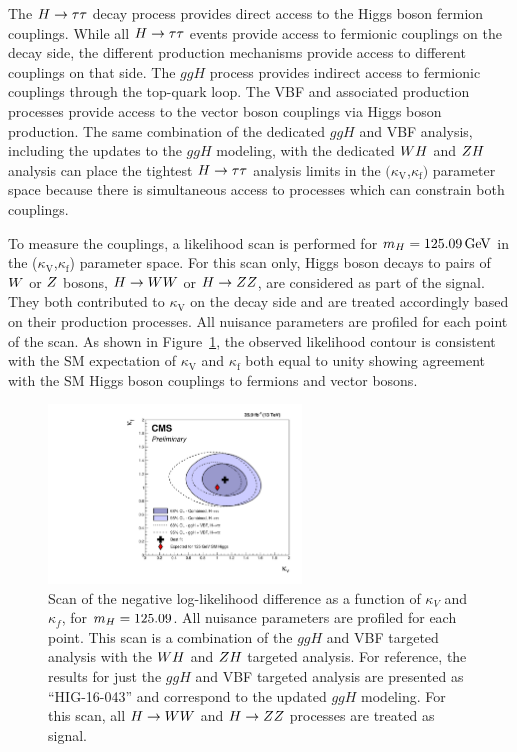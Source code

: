 The $H\to\tau\tau$ decay process
provides direct access to the Higgs boson fermion couplings. While all
$H\to\tau\tau$ events provide access to fermionic couplings on the decay side,
the different production mechanisms provide access to different couplings on that side.
The $ggH$ process provides indirect access to fermionic couplings through
the top-quark loop. The VBF and associated production processes provide access to the
vector boson couplings via Higgs boson production.
The same combination of the dedicated $ggH$ and VBF analysis, including
the updates to the $ggH$ modeling, with
the dedicated $WH$ and $ZH$ analysis can place the tightest
$H\to\tau\tau$ analysis limits in the $(\kappa_\text{V}$,$\kappa_\text{f})$ parameter space
because there is simultaneous access to processes which can constrain both
couplings.

To measure the couplings, a likelihood scan is performed for $m_{H}=125.09\,\mathrm{GeV}$ in 
the ($\kappa_\text{V}$,$\kappa_\text{f}$) parameter space.
For this scan only, Higgs boson decays to pairs of $W$ or $Z$ bosons, $H\to WW$ or $H\to ZZ$,
are considered as part of the signal. They both contributed to $\kappa_\text{V}$ on the
decay side and are treated accordingly based on their production processes.
All nuisance 
parameters are profiled for each point of the scan. As shown in 
Figure~\ref{fig:cmb_kFkV}, the observed likelihood contour is consistent with the SM expectation 
of $\kappa_\text{V}$ and $\kappa_\text{f}$ both equal to unity showing
agreement with the SM Higgs boson couplings to fermions and vector bosons.

\begin{figure}[!ht]
 \begin{center}
  \includegraphics[width=0.60\textwidth]{higgs_to_taus_vh/plots/combined/kFkV_HIG-18-007_plus_HIG-16-043_comp_up.pdf}
 \end{center}
 \caption{Scan of the negative 
 log-likelihood difference as a function of $\kappa_V$ and $\kappa_f$, for 
 $m_{H} = 125.09$\GeV.  All nuisance parameters are profiled for each point. 
 This scan is a combination of the $ggH$ and VBF targeted analysis with the 
 $WH$ and $ZH$ targeted analysis. For reference, the results for just
 the $ggH$ and VBF targeted analysis are presented as ``HIG-16-043'' and correspond
 to the updated $ggH$ modeling.
 For this scan, all $H\to WW$ and $H\to ZZ$ processes 
 are treated as signal.
 }
 \label{fig:cmb_kFkV}
\end{figure}



\clearpage
